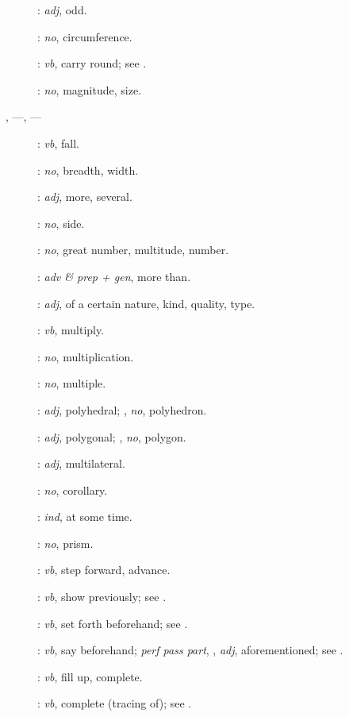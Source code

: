 {\begin{description}
\item[]: {\em adj}, odd.
\item[]: {\em no}, circumference.
\item[]: {\em vb}, carry round; see .
\item[]: {\em no}, magnitude, size.
\item[, ---, ---]: {\em vb}, fall.
\item[]: {\em no}, breadth, width.
\item[]: {\em adj}, more, several.
\item[]: {\em no}, side.
\item[]: {\em no}, great number, multitude, number.
\item[]: {\em adv \& prep + gen}, more than.
\item[]: {\em adj}, of a certain nature, kind, quality, type.
\item[]: {\em vb}, multiply.
\item[]: {\em no}, multiplication.
\item[]: {\em no}, multiple.
\item[]: {\em adj}, polyhedral; , {\em no}, polyhedron.
\item[]: {\em adj}, polygonal; , {\em no}, polygon.
\item[]: {\em adj}, multilateral.
\item[]: {\em no}, corollary.
\item[]: {\em ind}, at some time.
\item[]: {\em no}, prism.
\item[]: {\em vb}, step forward, advance.
\item[]: {\em vb}, show
previously; see .
\item[]: {\em vb}, set forth beforehand; see .
\item[]: {\em vb}, say beforehand; 
{\em perf pass part}, , {\em adj}, aforementioned;
see .
\item[]: {\em vb}, fill up, complete.
\item[]: {\em vb}, complete (tracing of); see .

\end{description}}
